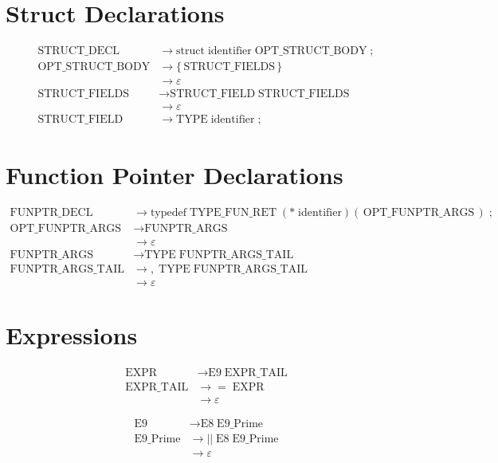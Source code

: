 \section{Struct Declarations}
\begin{align*}
\text{STRUCT\_DECL}
  &\to \text{struct}\;\text{identifier}\;\text{OPT\_STRUCT\_BODY}\; ;\\[6pt]
\text{OPT\_STRUCT\_BODY}
  &\to \{\,\text{STRUCT\_FIELDS}\,\}\\
  &\to \varepsilon\\[6pt]
\text{STRUCT\_FIELDS}
  &\to \text{STRUCT\_FIELD}\;\text{STRUCT\_FIELDS}\\
  &\to \varepsilon\\[6pt]
\text{STRUCT\_FIELD}
  &\to \text{TYPE}\;\text{identifier}\; ;
\end{align*}

\section{Function Pointer Declarations}
\begin{align*}
\text{FUNPTR\_DECL}
  &\to \text{typedef}\;\text{TYPE\_FUN\_RET}\;( *\;\text{identifier} )(\,\text{OPT\_FUNPTR\_ARGS}\,)\; ;\\[6pt]
\text{OPT\_FUNPTR\_ARGS}
  &\to \text{FUNPTR\_ARGS}\\
  &\to \varepsilon\\[6pt]
\text{FUNPTR\_ARGS}
  &\to \text{TYPE}\;\text{FUNPTR\_ARGS\_TAIL}\\[6pt]
\text{FUNPTR\_ARGS\_TAIL}
  &\to ,\;\text{TYPE}\;\text{FUNPTR\_ARGS\_TAIL}\\
  &\to \varepsilon
\end{align*}

\section{Expressions}
\begin{align*}
\text{EXPR}
  &\to \text{E9}\;\text{EXPR\_TAIL}\\[6pt]
\text{EXPR\_TAIL}
  &\to =\;\text{EXPR}\\
  &\to \varepsilon
\end{align*}

\begin{align*}
\text{E9}
  &\to \text{E8}\;\text{E9\_Prime}\\[6pt]
\text{E9\_Prime}
  &\to ||\;\text{E8}\;\text{E9\_Prime}\\
  &\to \varepsilon
\end{align*}

